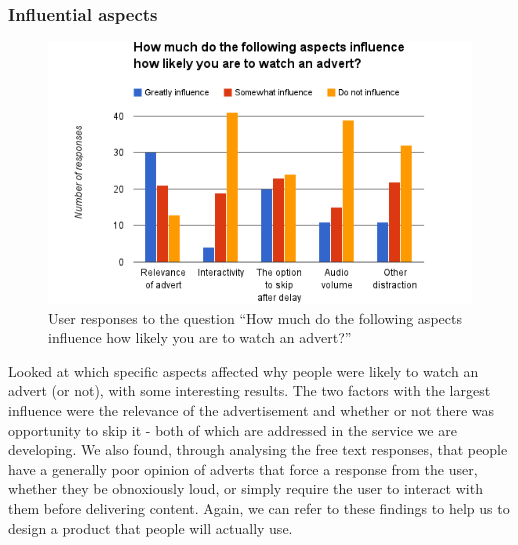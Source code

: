 \subsubsection{Influential aspects}
\label{sec:prestudy_influence}
\begin{figure}[H]
	\vspace{-10pt}
	\includegraphics[width=\textwidth, clip=true, trim=0 0 0 55pt]{images/prestudy_influence.png}
	\caption{User responses to the question ``How much do the following aspects influence how likely you are to watch an advert?''}
	\label{fig:prestudy_influence}
	\vspace{-15pt}
\end{figure}
Looked at which specific aspects affected why people were likely to watch an advert (or not), with some interesting results. The two factors with the largest influence were the relevance of the advertisement and whether or not there was opportunity to skip it - both of which are addressed in the service we are developing. We also found, through analysing the free text responses, that people have a generally poor opinion of adverts that force a response from the user, whether they be obnoxiously loud, or simply require the user to interact with them before delivering content. Again, we can refer to these findings to help us to design a product that people will actually use. 



